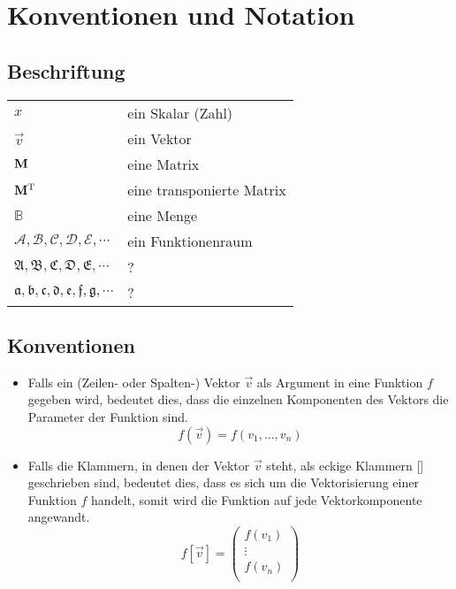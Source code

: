 \documentclass[../main]{subfiles}
\begin{document}
\newcommand{\refsec}[1]{
  \begin{tikzpicture}
  \node[rounded corners,fill=red] (0,0) {#1};
\end{tikzpicture}
}




\section{Konventionen und Notation}

\subsection*{Beschriftung}

\begin{tabular}{ll}
  $x$ & ein Skalar (Zahl) \\
  $\vec{v}$ & ein Vektor \\
  $\mathbf{M}$ & eine Matrix \\
  $\mathbf{M}^\mathrm{T}$ & eine transponierte Matrix \\
  $\mathbb{B}$ & eine Menge \\
  $\mathcal{A,B,C,D,E,\cdots}$ & ein Funktionenraum \\
  $\mathfrak{A,B,C,D,E,\cdots}$ & ? \\
  $\mathfrak{a,b,c,d,e,f,g,\cdots}$ & ? \\


\end{tabular}


\subsection*{Konventionen}

\begin{itemize}

\item{
    Falls ein (Zeilen- oder Spalten-) Vektor $\vec{v}$ als Argument in eine
    Funktion $f$ gegeben wird, bedeutet dies,
    dass die einzelnen Komponenten des Vektors die Parameter der Funktion sind.
    \begin{equation*}
      f(\vec{v})=f(v_1,\ldots,v_n)
    \end{equation*}
  }

\item{
    Falls die Klammern, in denen der Vektor $\vec{v}$ steht, als eckige
    Klammern [] geschrieben sind, bedeutet dies, dass es sich um die
    Vektorisierung einer Funktion $f$ handelt, somit wird die Funktion auf
    jede Vektorkomponente angewandt.
    \begin{equation*}
      f[\vec{v}]=
      \begin{pmatrix}
        f(v_1)\\
        \vdots \\
        f(v_n)\\
      \end{pmatrix}
    \end{equation*}
  }

\end{itemize}
\end{document}

